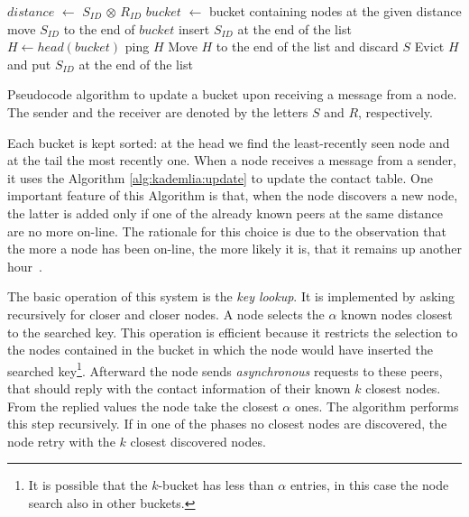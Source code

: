 \begin{algorithm}[t]
	\begin{algorithmic}
		\State $distance$ $\gets$ $S_{ID}$ $\otimes$ $R_{ID}$
		\State $bucket$ $\gets$ bucket containing nodes at the given distance
		\State move $S_{ID}$ to the end of $bucket$
		\Else
		\State insert $S_{ID}$ at the end of the list
		\Else
		\State $H \gets head(bucket)$
		\State ping $H$
		\State Move $H$ to the end of the list and discard $S$
		\Else
		\State Evict $H$ and put $S_{ID}$ at the end of the list
		\EndIf
		\EndIf
		\EndIf
	\end{algorithmic}
	\caption{Pseudocode algorithm to update a bucket upon receiving a message from a node. The sender and the receiver are denoted by the letters $S$ and $R$, respectively.}
	\label{alg:kademlia:update}
\end{algorithm}

Each bucket is kept sorted: at the head we find the least-recently seen node
and at the tail the most recently one.
When a node receives a message from a sender, it uses
the Algorithm \autoref{alg:kademlia:update} to update the contact table.
One important feature of this Algorithm is that, when the node discovers
a new node, the latter is added only if one of the already known peers at the
same distance are no more on-line. The rationale for this choice is due
to the observation that the more a node has been on-line, the more likely it is,
that it remains up another hour~\cite{bib:kademlia}.

The basic operation of this system is the \emph{key lookup}.
It is implemented by asking recursively for closer and closer nodes.
A node selects the $\alpha$ known nodes
closest to the searched key. This operation is efficient because
it restricts the selection to the nodes contained in the bucket in which the
node would have inserted the searched key\footnote{It is possible that the 
	$k$-bucket
has less than $\alpha$ entries, in this case the node search also in other
buckets.}.
Afterward the node sends \emph{asynchronous} requests to these peers, that
should reply with the contact information of their known $k$ closest nodes.
From the replied values the node take the closest $\alpha$ ones.
The algorithm performs this step recursively.
If in one of the phases no closest nodes are discovered, the node retry with
the $k$ closest discovered nodes.

